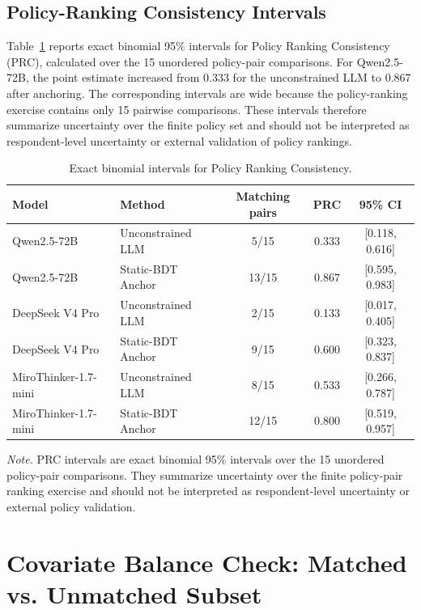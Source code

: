 \documentclass[11pt]{article}
\begin{document}
\subsection{Policy-Ranking Consistency Intervals}

Table~\ref{tab:bootstrap_prc} reports exact binomial 95\% intervals for Policy Ranking Consistency (PRC), calculated over the 15 unordered policy-pair comparisons. For Qwen2.5-72B, the point estimate increased from 0.333 for the unconstrained LLM to 0.867 after anchoring. The corresponding intervals are wide because the policy-ranking exercise contains only 15 pairwise comparisons. These intervals therefore summarize uncertainty over the finite policy set and should not be interpreted as respondent-level uncertainty or external validation of policy rankings.

\begin{table}[t]
\centering
\caption{Exact binomial intervals for Policy Ranking Consistency.}
\label{tab:bootstrap_prc}
\small
\setlength{\tabcolsep}{6pt}
\begin{tabular}{l l c c c}
\toprule
Model & Method & Matching pairs & PRC & 95\% CI \\
\midrule
Qwen2.5-72B & Unconstrained LLM & 5/15 & 0.333 & [0.118, 0.616] \\
Qwen2.5-72B & Static-BDT Anchor & 13/15 & 0.867 & [0.595, 0.983] \\
\midrule
DeepSeek V4 Pro & Unconstrained LLM & 2/15 & 0.133 & [0.017, 0.405] \\
DeepSeek V4 Pro & Static-BDT Anchor & 9/15 & 0.600 & [0.323, 0.837] \\
\midrule
MiroThinker-1.7-mini & Unconstrained LLM & 8/15 & 0.533 & [0.266, 0.787] \\
MiroThinker-1.7-mini & Static-BDT Anchor & 12/15 & 0.800 & [0.519, 0.957] \\
\bottomrule
\end{tabular}

\vspace{0.4em}
\begin{minipage}{0.95\textwidth}
\small
\textit{Note.} PRC intervals are exact binomial 95\% intervals over the 15 unordered policy-pair comparisons. They summarize uncertainty over the finite policy-pair ranking exercise and should not be interpreted as respondent-level uncertainty or external policy validation.
\end{minipage}
\end{table}

\section{Covariate Balance Check: Matched vs. Unmatched Subset}
\label{app:balance_check}
\end{document}
